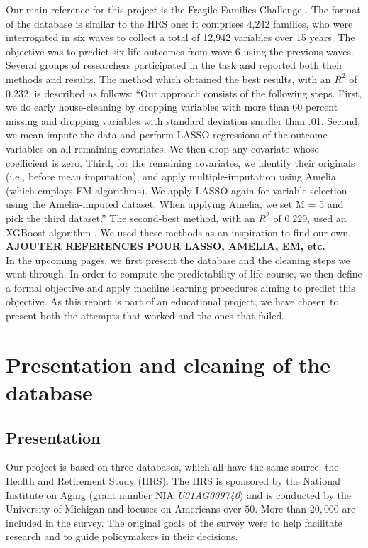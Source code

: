 \documentclass[]{article}
\begin{document}
\noindent
Our main reference for this project is the Fragile Families Challenge \cite{challenge2017}. The format of the database is similar to the HRS one: it comprises 4,242 families, who were interrogated in six waves to collect a total of 12,942 variables over 15 years. The objective was to predict six life outcomes from wave 6 using the previous waves. Several groups of researchers participated in the task and reported both their methods and results. The method which obtained the best results, with an $R^2$ of $0.232$, is described as follows: “Our approach consists of the following steps. First, we do early house-cleaning by dropping variables with more than 60 percent missing and dropping variables with standard deviation smaller than .01. Second, we mean-impute the data and perform LASSO regressions of the outcome variables on all remaining covariates. We then drop any covariate whose coefficient is zero. Third, for the remaining covariates, we identify their originals (i.e., before mean imputation), and apply multiple-imputation using Amelia (which employs EM algorithms). We apply LASSO again for variable-selection using the Amelia-imputed dataset. When applying Amelia, we set M = 5 and pick the third dataset.” 
The second-best method, with an $R^2$ of $0.229$, used an XGBoost algorithm \cite{xgboost2016}. We used these methods as an inspiration to find our own.
\textbf{AJOUTER REFERENCES POUR LASSO, AMELIA, EM, etc.} \\

\noindent
In the upcoming pages, we first present the database and the cleaning steps we went through. In order to compute the predictability of life course, we then define a formal objective and apply machine learning procedures aiming to predict this objective. As this report is part of an educational project, we have chosen to present both the attempts that worked and the ones that failed.

\section{Presentation and cleaning of the database}
\subsection{Presentation}
Our project is based on three databases, which all have the same source: the Health and Retirement Study (HRS). The HRS is sponsored by the National Institute on Aging (grant number NIA \textit{U01AG009740}) and is conducted by the University of Michigan and focuses on Americans over $50$. More than $20,000$ are included in the survey. The original goals of the survey were to help facilitate research and to guide policymakers in their decisions.\\
\end{document}
